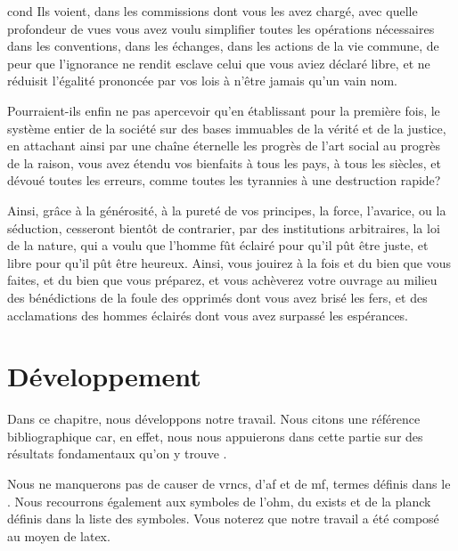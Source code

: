 \documentclass[12pt,space=onehalf,version=final]{yathesis}
\begin{document}
\begin{displaycquote}[pp.~509-511]{cond}
  Ils voient, dans les commissions dont vous les avez chargé, avec
  quelle profondeur de vues vous avez voulu simplifier toutes les
  opérations nécessaires dans les conventions, dans les échanges, dans
  les actions de la vie commune, de peur que l'ignorance ne rendit
  esclave celui que vous aviez déclaré libre, et ne réduisit l'égalité
  prononcée par vos lois à n'être jamais qu'un vain nom.

  Pourraient-ils enfin ne pas apercevoir qu'en établissant pour la
  première fois, le système entier de la société sur des bases
  immuables de la vérité et de la justice, en attachant ainsi par une
  chaîne éternelle les progrès de l'art social au progrès de la
  raison, vous avez étendu vos bienfaits à tous les pays, à tous les
  siècles, et dévoué toutes les erreurs, comme toutes les tyrannies à
  une destruction rapide?

  Ainsi, grâce à la générosité, à la pureté de vos principes, la
  force, l'avarice, ou la séduction, cesseront bientôt de contrarier,
  par des institutions arbitraires, la loi de la nature, qui a voulu
  que l'homme fût éclairé pour qu'il pût être juste, et libre pour
  qu'il pût être heureux. Ainsi, vous jouirez à la fois et du bien que
  vous faites, et du bien que vous préparez, et vous achèverez votre
  ouvrage au milieu des bénédictions de la foule des opprimés dont
  vous avez brisé les fers, et des acclamations des hommes éclairés
  dont vous avez surpassé les espérances.
\end{displaycquote}
\chapter{Développement}
\label{chap-developpement}

Dans ce chapitre, nous développons notre travail. Nous citons une
référence
bibliographique \autocite{relativite}
car, en effet, nous nous appuierons dans cette partie sur des
résultats fondamentaux qu'on y trouve
\autocite[chap.~3]{relativite}.

Nous ne manquerons pas de causer de \glspl{vrnc}, d'\gls{af} et de \gls{mf},
termes définis dans le . Nous recourrons également aux
symboles de l'\gls{ohm}, du \gls{exists} et de la \gls{planck} définis dans la
liste des symboles. Vous noterez que notre travail a été composé au moyen de
\gls{latex}.
\end{document}
